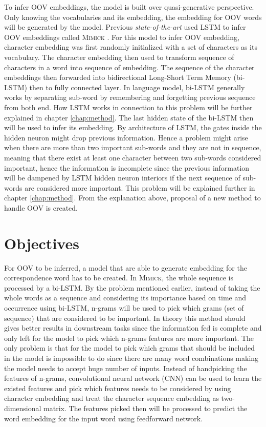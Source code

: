     To infer OOV embeddings, the model is built over quasi-generative
    perspective. Only knowing the vocabularies and its embedding, the
    embedding for OOV words will be generated by the model. Previous
    \textit{state-of-the-art} used LSTM to infer OOV embeddings called
    \textsc{Mimick} \citep{mimicking2017Pinter}. For this model to
    infer OOV embedding, character embedding was first randomly
    initialized with a set of characters as its vocabulary. The
    character embedding then used to transform sequence of characters
    in a word into sequence of embedding. The sequence of the
    character embeddings then forwarded into bidirectional Long-Short
    Term Memory (bi-LSTM) then to fully connected layer. In language
    model, bi-LSTM generally works by separating sub-word by
    remembering and forgetting previous sequence from both end. How
    LSTM works in connection to this problem will be further explained
    in chapter \ref{chap:method}. The last hidden state of the bi-LSTM
    then will be used to infer its embedding. By architecture of LSTM,
    the gates inside the hidden neuron might drop previous
    information. Hence a problem might arise when there are more than
    two important sub-words and they are not in sequence, meaning that
    there exist at least one character between two sub-words
    considered important, hence the information is incomplete since
    the previous information will be dampened by LSTM hidden neuron
    interiors if the next sequence of sub-words are considered more
    important. This problem will be explained further in chapter
    \ref{chap:method}. From the explanation above, proposal of a new
    method to handle OOV is created.

\section{Objectives}
    For OOV to be inferred, a model that are able to generate
    embedding for the correspondence word has to be created. In
    \textsc{Mimick}, the whole sequence is processed by a bi-LSTM. By
    the problem mentioned earlier, instead of taking the whole words
    as a sequence and considering its importance based on time and
    occurrence using bi-LSTM, n-grams will be used to pick which grams
    (set of sequence) that are considered to be important. In theory
    this method should gives better results in downstream tasks since
    the information fed is complete and only left for the model to
    pick which n-grams features are more important. The only problem
    is that for the model to pick which grams that should be included
    in the model is impossible to do since there are many word
    combinations making the model needs to accept huge number of
    inputs. Instead of handpicking the features of n-grams,
    convolutional neural network (CNN) can be used to learn the
    existed features and pick which features needs to be considered by
    using character embedding and treat the character sequence
    embedding as two-dimensional matrix. The features picked then will
    be processed to predict the word embedding for the input word
    using feedforward network.

